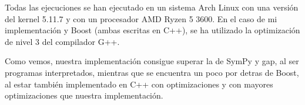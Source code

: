 \documentclass[12pt, spanish]{article}
\begin{document}
Todas las ejecuciones se han ejecutado en un sistema Arch Linux con una versión del kernel 5.11.7 y con un procesador AMD Ryzen 5 3600. En el caso de mi implementación y Boost (ambas escritas en C++), se ha utilizado la optimización de nivel 3 del compilador G++.

Como vemos, nuestra implementación consigue superar la de SymPy y gap, al ser programas interpretados, mientras que se encuentra un poco por detras de Boost, al estar también implementado en C++ con optimizaciones y con mayores optimizaciones que nuestra implementación.

%
%
\end{document}

